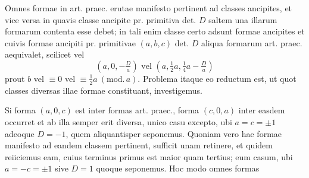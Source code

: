 Omnes formae in art. praec. erutae manifesto pertinent ad classes ancipites, et vice versa in quavis classe ancipite pr. primitiva det. \(D\) saltem una illarum formarum contenta esse debet; in tali enim classe certo adsunt formae ancipites et cuivis formae ancipiti pr. primitivae \((a,b,c)\) det. \(D\) aliqua formarum art. praec. aequivalet, scilicet vel
\[
(a,0,-\tfrac{D}{a})\text{ vel }(a,\tfrac12 a,\tfrac14 a-\tfrac{D}{a})
\]
prout \(b\) vel \(\equiv0\) vel \(\equiv\frac12 a\ (\mathrm{mod.}\,a)\). Problema itaque eo reductum est, ut quot classes diversas illae formae constituant, investigemus.

Si forma \((a,0,c)\) est inter formas art. praec., forma \((c,0,a)\) inter easdem occurret et ab illa semper erit diversa, unico casu excepto, ubi \(a=c=\pm1\) adeoque \(D=-1\), quem aliquantisper seponemus. Quoniam vero hae formae manifesto ad eandem classem pertinent, sufficit unam retinere, et quidem reiiciemus eam, cuius terminus primus est maior quam tertius; eum casum, ubi \(a=-c=\pm1\) sive \(D=1\) quoque seponemus. Hoc modo omnes formas
